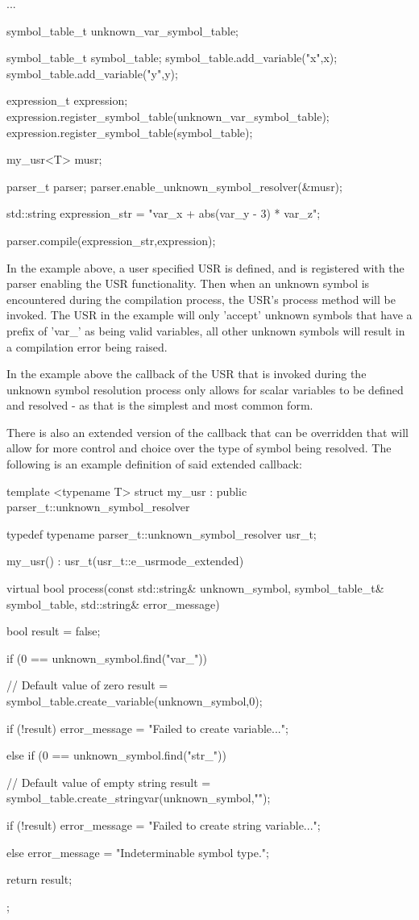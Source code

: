 ...

symbol\_table\_t unknown\_var\_symbol\_table;

symbol\_table\_t symbol\_table;
symbol\_table.add\_variable("x",x);
symbol\_table.add\_variable("y",y);

expression\_t expression;
expression.register\_symbol\_table(unknown\_var\_symbol\_table);
expression.register\_symbol\_table(symbol\_table);

my\_usr<T> musr;

parser\_t parser;
parser.enable\_unknown\_symbol\_resolver(\&musr);

std::string expression\_str = "var\_x + abs(var\_y - 3) * var\_z";

parser.compile(expression\_str,expression);


In  the  example  above,  a user  specified  USR  is  defined, and  is
registered with the parser  enabling the USR functionality.  Then when
an unknown symbol is  encountered during the compilation  process, the
USR's process method will be invoked. The USR in the example will only
'accept' unknown symbols that have  a prefix of 'var\_' as  being valid
variables,  all other  unknown symbols  will result  in a  compilation
error being raised.

In the example above  the callback of the  USR that is invoked  during
the unknown symbol resolution process only allows for scalar variables
to be defined and resolved -  as that is the simplest and  most common
form.

There  is  also  an  extended version  of  the  callback  that can  be
overridden that will allow for  more control and choice over  the type
of symbol being  resolved. The following  is an example  definition of
said extended callback:

template <typename T>
struct my\_usr : public parser\_t::unknown\_symbol\_resolver
{
typedef typename parser\_t::unknown\_symbol\_resolver usr\_t;

my\_usr()
: usr\_t(usr\_t::e\_usrmode\_extended)
{}

virtual bool process(const std::string\& unknown\_symbol,
symbol\_table\_t\&      symbol\_table,
std::string\&        error\_message)
{
	bool result = false;
	
	if (0 == unknown\_symbol.find("var\_"))
	{
		// Default value of zero
		result = symbol\_table.create\_variable(unknown\_symbol,0);
		
		if (!result)
		{
			error\_message = "Failed to create variable...";
		}
	}
	else if (0 == unknown\_symbol.find("str\_"))
	{
		// Default value of empty string
		result = symbol\_table.create\_stringvar(unknown\_symbol,"");
		
		if (!result)
		{
			error\_message = "Failed to create string variable...";
		}
	}
	else
	error\_message = "Indeterminable symbol type.";
	
	return result;
}
};


